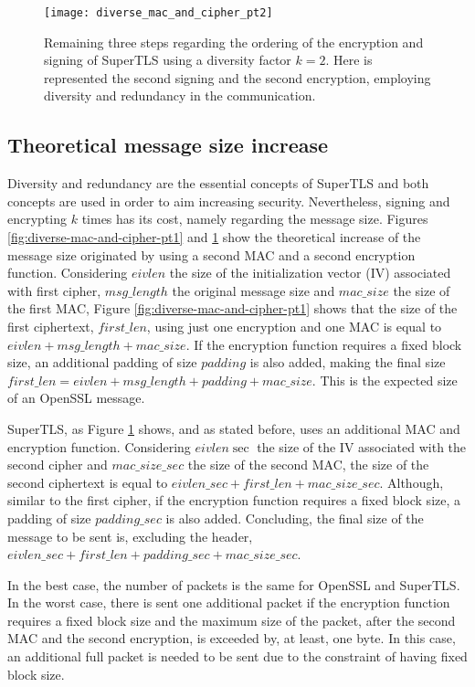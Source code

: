 \documentclass{sig-alternate-05-2015}
\begin{document}
\begin{figure}[t]
\texttt{[image: diverse\_mac\_and\_cipher\_pt2]}
\centering
\caption{Remaining three steps regarding the ordering of the encryption and signing of SuperTLS using a diversity factor $k = 2$. Here is represented the second signing and the second encryption, employing diversity and redundancy in the communication.}
\label{fig:diverse-mac-and-cipher-pt2}
\end{figure}

\subsection{Theoretical message size increase}
\label{subsec:theretical-msg-size}

Diversity and redundancy are the essential concepts of SuperTLS and both concepts are used in order to aim increasing security. Nevertheless, signing and encrypting $k$ times has its cost, namely regarding the message size.
Figures \ref{fig:diverse-mac-and-cipher-pt1} and \ref{fig:diverse-mac-and-cipher-pt2} show the theoretical increase of the message size originated by using a second MAC and a second encryption function. Considering $eivlen$ the size of the initialization vector (IV) associated with first cipher, $msg\_length$ the original message size and $mac\_size$ the size of the first MAC, Figure \ref{fig:diverse-mac-and-cipher-pt1} shows that the size of the first ciphertext, $first\_len$, using just one encryption and one MAC is equal to $eivlen+msg\_length+mac\_size$. If the encryption function requires a fixed block size, an additional padding of size $padding$ is also added, making the final size $first\_len=eivlen+msg\_length+padding+mac\_size$. This is the expected size of an OpenSSL message.

SuperTLS, as Figure \ref{fig:diverse-mac-and-cipher-pt2} shows, and as stated before, uses an additional MAC and encryption function. Considering $eivlen\sec$ the size of the IV associated with the second cipher and $mac\_size\_sec$ the size of the second MAC, the size of the second ciphertext is equal to $eivlen\_sec+first\_len+mac\_size\_sec$. Although, similar to the first cipher, if the encryption function requires a fixed block size, a padding of size $padding\_sec$ is also added. Concluding, the final size of the message to be sent is, excluding the header, $eivlen\_sec+first\_len+padding\_sec+mac\_size\_sec$.

In the best case, the number of packets is the same for OpenSSL and SuperTLS. In the worst case, there is sent one additional packet if the encryption function requires a fixed block size and the maximum size of the packet, after the second MAC and the second encryption, is exceeded by, at least, one byte. In this case, an additional full packet is needed to be sent due to the constraint of having fixed block size.
\end{document}
